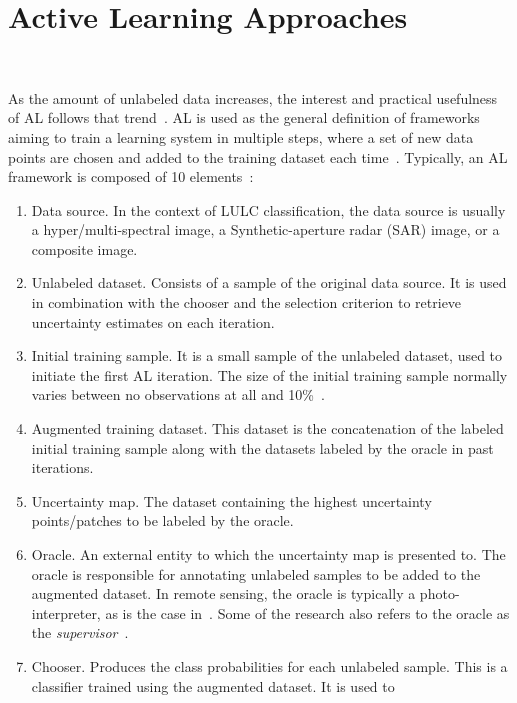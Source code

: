 \documentclass[parskip=full]{scrartcl}
\begin{document}
\section{Active Learning Approaches}~\label{sec:al-sota}

As the amount of unlabeled data increases, the interest and practical usefulness
of AL follows that trend~\cite{Kottke2017}. AL is used as the general definition
of frameworks aiming to train a learning system in multiple steps, where a set
of new data points are chosen and added to the training dataset each
time~\cite{Ruzicka2020}. Typically, an AL framework is composed of 10
elements~\cite{Sverchkov2017,Su2020,Ruzicka2020}:

\begin{enumerate}
    \item Data source. In the context of LULC classification, the data source is
        usually a hyper/multi-spectral image, a Synthetic-aperture radar (SAR)
        image, or a composite image.
    \item Unlabeled dataset. Consists of a sample of the original data source.
        It is used in combination with the chooser and the selection criterion
        to retrieve uncertainty estimates on each iteration.
    \item Initial training sample. It is a small sample of the unlabeled
        dataset, used to initiate the first AL iteration. The size of the
        initial training sample normally varies between no observations at all
        and 10\%~\cite{Li2013}.
    \item Augmented training dataset. This dataset is the concatenation of the
        labeled initial training sample along with the datasets labeled by the
        oracle in past iterations.
    \item Uncertainty map. The dataset containing the highest uncertainty
        points/patches to be labeled by the oracle.
    \item Oracle. An external entity to which the uncertainty map is presented
        to. The oracle is responsible for annotating unlabeled samples to be
        added to the augmented dataset. In remote sensing, the oracle is
        typically a photo-interpreter, as is the case in~\cite{li2020}. Some of
        the research also refers to the oracle as the
        \textit{supervisor}~\cite{Su2020, Shrivastava2021}.
    \item Chooser. Produces the class probabilities for each unlabeled sample.
        This is a classifier trained using the augmented dataset. It is used to

\end{enumerate}
\end{document}
